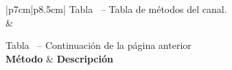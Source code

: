 \renewcommand{\tablename}{Tabla}
\renewcommand{\thechapter}{Anexo}

\begin{longtable}{|p{7cm}|p{8.5cm}|}
    {{\tablename\ \thetable{} -- Tabla de métodos del canal.}} \\
    \hline
     &  \\
    \hline
    \endfirsthead
    
    {{\tablename\ \thetable{} -- Continuación de la página anterior}} \\
    \hline
    \textbf{Método} & \textbf{Descripción} \\
    \hline
    \endhead
    
    \hline {} \\
    \endfoot
    

\end{longtable}
